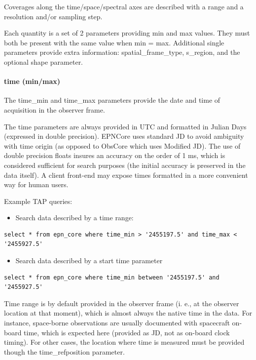 \documentclass[11pt,a4paper]{ivoa}
\begin{document}
Coverages along the time/space/spectral axes are described with a range and a resolution and/or sampling step. 

Each quantity is a set of 2 parameters providing min and max values. They must both be present with the same value when min = max. Additional single parameters provide extra information: spatial\_frame\_type, s\_region, and the optional shape parameter.

\paragraph{time (min/max)}

The time\_min and time\_max parameters provide the date and time of acquisition in the observer frame. 

The time parameters are always provided in UTC and formatted in Julian Days (expressed in double precision). EPNCore uses standard JD to avoid ambiguity with time origin (as opposed to ObsCore which uses Modified JD). The use of double precision floats insures an accuracy on the order of 1 ms, which is considered sufficient for search purposes (the initial accuracy is preserved in the data itself). A client front-end may expose times formatted in a more convenient way for human users.

Example TAP queries:

\begin{itemize}
\item Search data described by a time range:
\end{itemize}

\begin{verbatim}
select * from epn_core where time_min > '2455197.5' and time_max < '2455927.5'
\end{verbatim}

\begin{itemize}
\item Search data described by a start time parameter
\end{itemize}

\begin{verbatim}
select * from epn_core where time_min between '2455197.5' and '2455927.5'
\end{verbatim}

Time range is by default provided in the observer frame (i. e., at the observer location at that moment), which is almost always the native time in the data. For instance, space-borne observations are usually documented with spacecraft on-board time, which is expected here (provided as JD, not as on-board clock timing). For other cases, the location where time is measured must be provided though the time\_refposition parameter.
\end{document}
